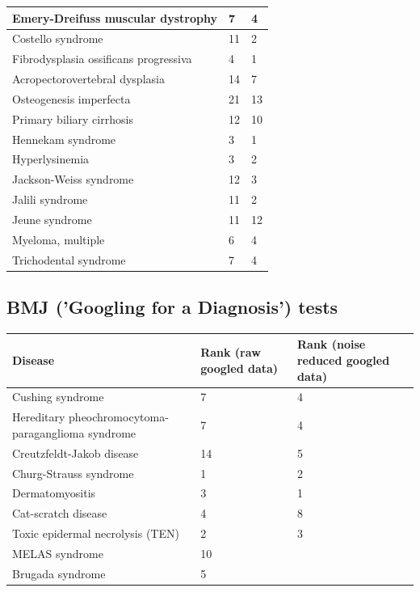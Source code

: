 \documentclass[10pt,letterpaper,final]{article}
\begin{document}
\begin{center}
\begin{small}
\begin{tabular}{|p{3.5cm}|p{1.8cm}|p{1.8cm}|}
    \hline
    Emery-Dreifuss muscular dystrophy  & 7 & 4\\
    \hline
    Costello syndrome  & 11 & 2\\
    \hline
    Fibrodysplasia ossificans progressiva  & 4 & 1\\
    \hline
    Acropectorovertebral dysplasia  & 14 & 7\\
    \hline
    Osteogenesis imperfecta  & 21 & 13\\
    \hline
    Primary biliary cirrhosis  & 12 & 10\\
    \hline
    Hennekam syndrome  & 3 & 1\\
    \hline
    Hyperlysinemia  & 3 & 2\\
    \hline
    Jackson-Weiss syndrome  & 12 & 3\\
    \hline
    Jalili syndrome & 11 & 2\\
    \hline
    Jeune syndrome & 11 & 12\\
    \hline
    Myeloma, multiple  & 6 & 4\\
    \hline
    Trichodental syndrome  & 7 & 4\\
    \hline
    \end{tabular}
\end{small}
\end{center}

\newpage
\subsection{BMJ ('Googling for a Diagnosis') tests }

\begin{center}
\begin{small}
	\begin{tabular}{|p{3.5cm}|p{1.8cm}|p{1.8cm}|}
	\hline
	\textbf{Disease}  & \textbf{Rank (raw googled data)} & \textbf{Rank (noise reduced googled data)} \\
    \hline\hline
    Cushing syndrome  & 7 &  4\\
    \hline
    Hereditary pheochromocytoma-paraganglioma syndrome  & 7 & 4\\
    \hline
    Creutzfeldt-Jakob disease  & 14 & 5\\
    \hline
    Churg-Strauss syndrome  & 1 & 2\\
    \hline
    Dermatomyositis  & 3 & 1\\
    \hline
    Cat-scratch disease  & 4 & 8\\
    \hline
    Toxic epidermal necrolysis (TEN)  & 2 & 3\\
    \hline
    MELAS syndrome  & 10 & \\
    \hline
    Brugada syndrome  & 5 & \\
    \hline
	\end{tabular}
\label{tab:results_bmj}
\end{small}
\end{center}
\end{document}
